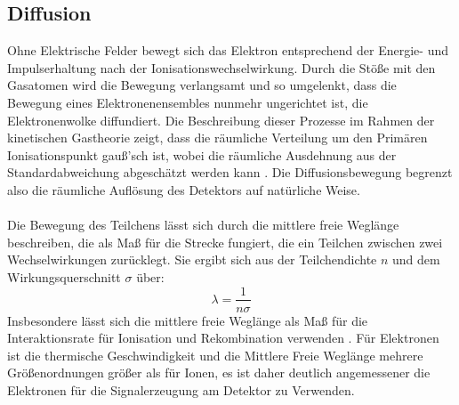 		\subsection{Diffusion}	
		Ohne Elektrische Felder bewegt sich das Elektron entsprechend der Energie- und Impulserhaltung nach der Ionisationswechselwirkung. Durch die Stöße mit den Gasatomen wird die Bewegung verlangsamt und so umgelenkt, dass die Bewegung eines Elektronenensembles nunmehr ungerichtet ist, die Elektronenwolke diffundiert. Die Beschreibung dieser Prozesse im Rahmen der kinetischen Gastheorie zeigt, dass die räumliche Verteilung um den Primären Ionisationspunkt gauß'sch ist, wobei die räumliche Ausdehnung aus der Standardabweichung abgeschätzt werden kann \cite{Sauli_Multiwire}. Die Diffusionsbewegung begrenzt also die räumliche Auflösung des Detektors auf natürliche Weise.\\
		\\
		Die Bewegung des Teilchens lässt sich durch die mittlere freie Weglänge beschreiben, die als Maß für die Strecke fungiert, die ein Teilchen zwischen zwei Wechselwirkungen zurücklegt. Sie ergibt sich aus der Teilchendichte $n$ und dem Wirkungsquerschnitt $\sigma$ über:
		\begin{equation}
			\lambda=\frac{1}{n\sigma}
		\end{equation} 
		Insbesondere lässt sich die mittlere freie Weglänge als Maß für die Interaktionsrate für Ionisation und Rekombination verwenden \cite{Sauli_Multiwire}. Für Elektronen ist die thermische Geschwindigkeit und die Mittlere Freie Weglänge mehrere Größenordnungen größer als für Ionen, es ist daher deutlich angemessener die Elektronen für die Signalerzeugung am Detektor zu Verwenden.
		
